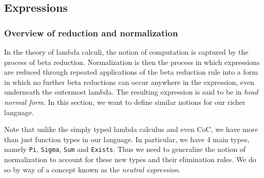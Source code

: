 \documentclass{article}
\begin{document}
\subsection{Expressions}
\subsubsection{Overview of reduction and normalization}
In the theory of lambda calculi, the notion of computation is captured by the
process of beta reduction. Normalization is then the process in which
expressions are reduced through repeated applications of the beta reduction
rule into a form in which no further beta reductions can occur anywhere in the
expression, even underneath the outermost lambda.
The resulting expression is said to be in \textit{head normal form}. 
In this section, we want to define similar notions for our richer language.

Note that unlike the simply typed lambda calculus and even CoC, we have more
than just function types in our language. In particular, we have 4 main types,
namely \texttt{Pi}, \texttt{Sigma}, \texttt{Sum} and \texttt{Exists}.
Thus we need to generalize the notion of normalization to account for these new
types and their elimination rules.
We do so by way of a concept known as the \textit{neutral expression}.






\end{document}

